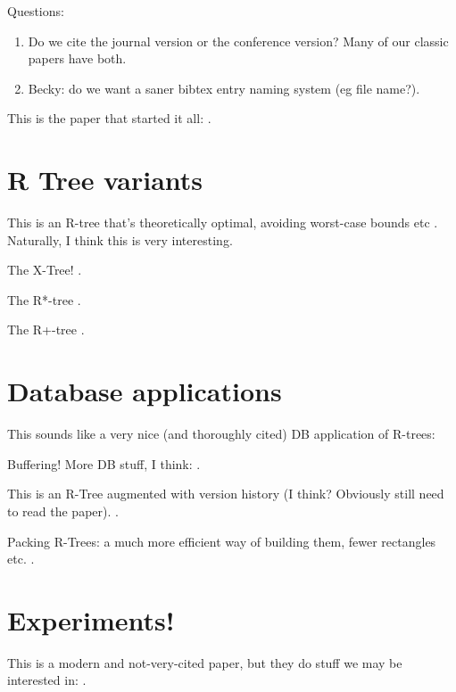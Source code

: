 \documentclass{article}
\begin{document}
Questions:
\begin{enumerate}
\item Do we cite the journal version or the conference version? Many of our classic papers have both.
\item Becky: do we want a saner bibtex entry naming system (eg file name?).
\end{enumerate}

This is the paper that started it all: \cite{Guttman:1984:RDI:971697.602266}.

\section{R Tree variants}
This is an R-tree that's theoretically optimal, avoiding worst-case bounds etc \cite{Arge:2004:PRP:1007568.1007608}.
Naturally, I think this is very interesting.

The X-Tree! \cite{DBLP:conf/vldb/BerchtoldKK96}.

The R*-tree \cite{Beckmann:1990:RER:93605.98741}.

The R+-tree \cite{DBLP:conf/vldb/SellisRF87}.

\section{Database applications}
This sounds like a very nice (and thoroughly cited) DB application of R-trees: \cite{Brinkhoff:1993:EPS:170035.170075}

Buffering! More DB stuff, I think: \cite{DBLP:conf/vldb/BiveinisSJ07}.

This is an R-Tree augmented with version history (I think? Obviously still need to read the paper). \cite{Nascimento:1998:THR:330560.330692}.

Packing R-Trees: a much more efficient way of building them, fewer rectangles etc. \cite{Kamel:1993:PR:170088.170403}.

\section{Experiments!}
This is a modern and not-very-cited paper, but they do stuff we may be interested in:
\cite{DBLP:conf/ssd/HwangKCL03}.



\end{document}
